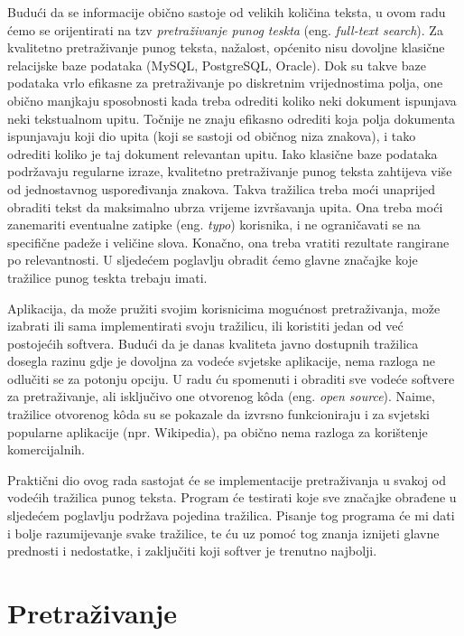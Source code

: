\documentclass[a4paper,twoside,12pt]{scrreprt}
\begin{document}
Budući da se informacije obično sastoje od velikih količina teksta, u ovom radu ćemo se orijentirati na tzv \textit{pretraživanje punog teskta} (eng. \textit{full-text search}). Za kvalitetno pretraživanje punog teksta, nažalost, općenito nisu dovoljne klasične relacijske baze podataka (MySQL, PostgreSQL, Oracle). Dok su takve baze podataka vrlo efikasne za pretraživanje po diskretnim vrijednostima polja, one obično manjkaju sposobnosti kada treba odrediti koliko neki dokument ispunjava neki tekstualnom upitu. Točnije ne znaju efikasno odrediti koja polja dokumenta ispunjavaju koji dio upita (koji se sastoji od običnog niza znakova), i tako odrediti koliko je taj dokument relevantan upitu. Iako klasične baze podataka podržavaju regularne izraze, kvalitetno pretraživanje punog teksta zahtijeva više od jednostavnog uspoređivanja znakova. Takva tražilica treba moći unaprijed obraditi tekst da maksimalno ubrza vrijeme izvršavanja upita. Ona treba moći zanemariti eventualne zatipke (eng. \textit{typo}) korisnika, i ne ograničavati se na specifične padeže i veličine slova. Konačno, ona treba vratiti rezultate rangirane po relevantnosti. U sljedećem poglavlju obradit ćemo glavne značajke koje tražilice punog teskta trebaju imati.

Aplikacija, da može pružiti svojim korisnicima mogućnost pretraživanja, može izabrati ili sama implementirati svoju tražilicu, ili koristiti jedan od već postojećih softvera. Budući da je danas kvaliteta javno dostupnih tražilica dosegla razinu gdje je dovoljna za vodeće svjetske aplikacije, nema razloga ne odlučiti se za potonju opciju. U radu ću spomenuti i obraditi sve vodeće softvere za pretraživanje, ali isključivo one otvorenog kôda (eng. \textit{open source}). Naime, tražilice otvorenog kôda su se pokazale da izvrsno funkcioniraju i za svjetski popularne aplikacije (npr. Wikipedia), pa obično nema razloga za korištenje komercijalnih.

Praktični dio ovog rada sastojat će se implementacije pretraživanja u svakoj od vodećih tražilica punog teksta. Program će testirati koje sve značajke obrađene u sljedećem poglavlju podržava pojedina tražilica. Pisanje tog programa će mi dati i bolje razumijevanje svake tražilice, te ću uz pomoć tog znanja iznijeti glavne prednosti i nedostatke, i zaključiti koji softver je trenutno najbolji.

\chapter{Pretraživanje} \label{searching}
\end{document}
